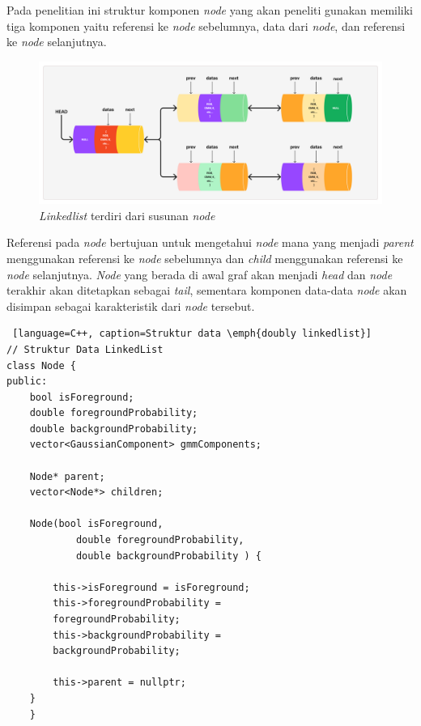 Pada penelitian ini struktur komponen \emph{node} yang akan peneliti gunakan 
memiliki tiga komponen yaitu referensi ke \emph{node} sebelumnya, data dari \emph{node},
dan referensi ke \emph{node} selanjutnya.

\begin{figure}[H]
	\centering{}
	\includegraphics[width=\textwidth]{gambar/linkedlist_example.png}
	\caption{\emph{Linkedlist} terdiri dari susunan \emph{node}}
\end{figure}

Referensi pada \emph{node} bertujuan untuk mengetahui \emph{node} mana yang 
menjadi \emph{parent} menggunakan referensi ke \emph{node} sebelumnya  dan 
\emph{child} menggunakan referensi ke \emph{node} selanjutnya. \emph{Node} yang berada di awal graf akan menjadi \emph{head} dan \emph{node}
terakhir akan ditetapkan sebagai \emph{tail}, sementara komponen data-data
\emph{node} akan disimpan sebagai karakteristik dari \emph{node} tersebut.

\begin{lstlisting} [language=C++, caption=Struktur data \emph{doubly linkedlist}]
// Struktur Data LinkedList
class Node {
public:
    bool isForeground;
    double foregroundProbability;
    double backgroundProbability;
    vector<GaussianComponent> gmmComponents;

    Node* parent;
    vector<Node*> children;

    Node(bool isForeground, 
            double foregroundProbability, 
            double backgroundProbability ) {

        this->isForeground = isForeground;
        this->foregroundProbability = 
        foregroundProbability;
        this->backgroundProbability = 
        backgroundProbability;
        
        this->parent = nullptr;
    }
 	}
\end{lstlisting}


